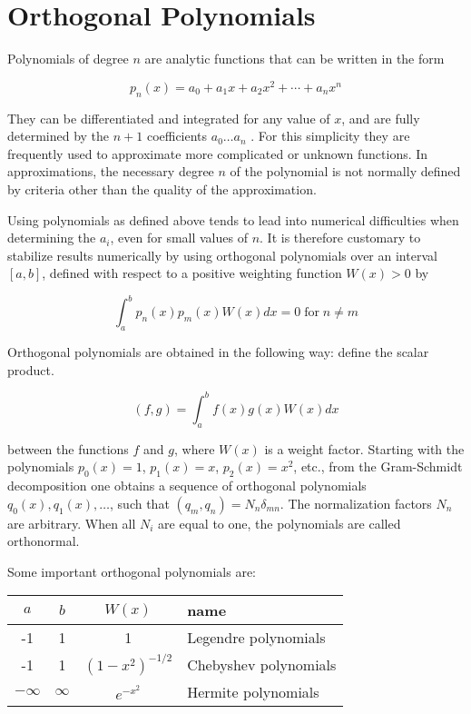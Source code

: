 \documentclass[12pt]{article}
\begin{document}
\section{Orthogonal Polynomials}

Polynomials of degree $n$ are analytic functions that can be written in the form

$$ p_n(x) = a_0 + a_1 x + a_2 x^2 + \cdots + a_n x^n $$

They can be differentiated and integrated for any value of $x$, and are fully determined by the $n+1$ coefficients $a_0 \ldots a_n$ . For this simplicity they are frequently used to approximate more complicated or unknown functions. In approximations, the necessary degree $n$ of the polynomial is not normally defined by criteria other than the quality of the approximation.

Using polynomials as defined above tends to lead into numerical difficulties when determining the $a_i$, even for small values of $n$. It is therefore customary to stabilize results numerically by using orthogonal polynomials over an interval $[a,b]$, defined with respect to a positive weighting function $W(x) > 0$ by

$$ \int_a^b p_n(x)p_m(x) W(x) dx = 0 \; \text{for} \; n \ne m $$

Orthogonal polynomials are obtained in the following way: define the scalar product.

$$ (f,g) = \int_a^b f(x)g(x)W(x) dx $$

between the functions $f$ and $g$, where $W(x)$ is a weight factor. Starting with the polynomials $p_0(x)=1$, $p_1(x)=x$, $p_2(x)=x^2$, etc., from the Gram-Schmidt decomposition one obtains a sequence of orthogonal polynomials $q_0(x),q_1(x),\ldots$, such that $(q_m,q_n)=N_n \delta_{mn}$. The normalization factors $N_n$ are arbitrary. When all $N_i$ are equal to one, the polynomials are called orthonormal.

Some important orthogonal polynomials are:

\begin{center}
\begin{tabular}{cccl}
$a$ & $b$ & $W(x)$ & name \\
\hline
-1  & 1   &  1     & Legendre polynomials \\
-1  & 1   &  $(1-x^2)^{-1/2}$ & Chebyshev polynomials \\
$-\infty$ & $\infty$ & $e^{-x^2}$ & Hermite polynomials
\end{tabular}
\end{center}
\end{document}
